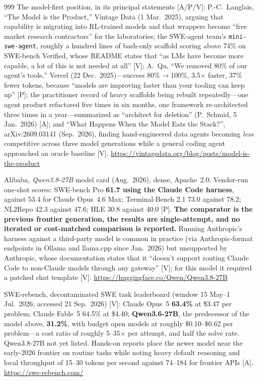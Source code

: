 \begin{thebibliography}{999}
 The model-first position, in its principal statements [A/P/V]: P.-C.~Langlais, ``The Model is the Product,'' Vintage Data (1 Mar.\ 2025), arguing that capability is migrating into RL-trained models and that wrappers become ``free market research contractors'' for the laboratories; the SWE-agent team's \texttt{mini-swe-agent}, roughly a hundred lines of bash-only scaffold scoring above 74\% on SWE-bench Verified, whose README states that ``as LMs have become more capable, a lot of this is not needed at all'' [V]; A.~Qu, ``We removed 80\% of our agent's tools,'' Vercel (22 Dec.\ 2025)---success 80\%$\rightarrow$100\%, 3.5$\times$ faster, 37\% fewer tokens, because ``models are improving faster than your tooling can keep up'' [P]; the practitioner record of heavy scaffolds being rebuilt repeatedly---one agent product refactored five times in six months, one framework re-architected three times in a year---summarized as ``architect for deletion'' (P.~Schmid, 5 Jan.\ 2026) [A]; and ``What Happens When the Model Eats the Stack?'', arXiv:2609.03141 (Sep.\ 2026), finding hand-engineered data agents becoming \emph{less} competitive across three model generations while a general coding agent approached an oracle baseline [V]. \url{https://vintagedata.org/blog/posts/model-is-the-product}

 Alibaba, \emph{Qwen3.8-27B} model card (Aug.\ 2026), dense, Apache~2.0. Vendor-run one-shot scores: SWE-bench Pro \textbf{61.7 using the Claude Code harness}, against 53.4 for Claude Opus~4.6 Max; Terminal-Bench 2.1 73.0 against 78.2; NL2Repo 42.3 against 47.6; HLE 30.8 against 40.0 [P]. \textbf{The comparator is the previous frontier generation, the results are single-attempt, and no iterated or cost-matched comparison is reported.} Running Anthropic's harness against a third-party model is common in practice (via Anthropic-format endpoints in Ollama and llama.cpp since Jan.\ 2026) but unsupported by Anthropic, whose documentation states that it ``doesn't support routing Claude Code to non-Claude models through any gateway'' [V]; for this model it required a patched chat template [V]. \url{https://huggingface.co/Qwen/Qwen3.8-27B}

 SWE-rebench, decontaminated SWE task leaderboard (window 15 May--1 Jul.\ 2026; accessed 21 Sep.\ 2026) [V]: Claude Opus~5 \textbf{63.4\%} at \$3.47 per problem; Claude Fable~5 64.5\% at \$4.40; \textbf{Qwen3.6-27B}, the predecessor of the model above, \textbf{31.2\%}, with budget open models at roughly \$0.10--\$0.62 per problem---a cost ratio of roughly 5--35$\times$ per attempt, and half the solve rate. Qwen3.8-27B not yet listed. Hands-on reports place the newer model near the early-2026 frontier on routine tasks while noting heavy default reasoning and local throughput of 15--30 tokens per second against 74--184 for frontier APIs [A]. \url{https://swe-rebench.com/}


\end{thebibliography}
